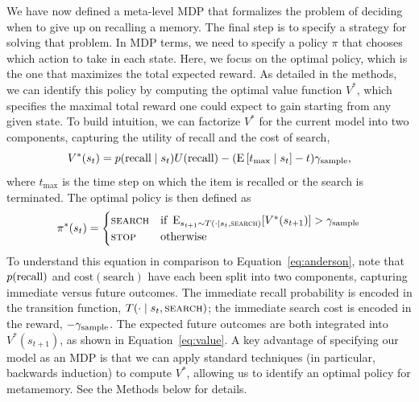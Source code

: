We have now defined a meta-level MDP that formalizes the problem of deciding when to give up on recalling a memory. The final step is to specify a strategy for solving that problem. In MDP terms, we need to specify a policy $\pi$ that chooses which action to take in each state. Here, we focus on the optimal policy, which is the one that maximizes the total expected reward. As detailed in the methods, we can identify this policy by computing the optimal value function $V^*$, which specifies the maximal total reward one could expect to gain starting from any given state. To build intuition, we can factorize $V^*$ for the current model into two components, capturing the utility of recall and the cost of search,
%
\begin{equation}\label{eq:value}
  V^*(s_t) = p(\text{recall} \mid s_t) U({\text{recall}}) - 
  (\operatorname*{E}\left[t_\text{max}\mid s_t\right] - t)\gamma_\text{sample},
\end{equation}
%
where $t_\text{max}$ is the time step on which the item is recalled or the search is terminated. The optimal policy is then defined as
%
\begin{equation}\label{eq:policy}
  \pi^*(s_t) = \begin{cases}
    \textsc{search} & \text{if } \operatorname*{E}_{s_{t+1} \sim T(\cdot \mid s_t, \textsc{search})}[V^*(s_{t+1})] > \gamma_\text{sample} \\
    \textsc{stop} & \text{otherwise}
  \end{cases}
\end{equation}
%
To understand this equation in comparison to Equation~\ref{eq:anderson}, note that $p({\text{recall}})$ and $\text{cost}(\text{search})$ have each been split into two components, capturing immediate versus future outcomes. The immediate recall probability is encoded in the transition function, $T(\cdot \mid s_t, \textsc{search})$; the immediate search cost is encoded in the reward, $-\gamma_\text{sample}$. The expected future outcomes are both integrated into $V^*(s_{t+1})$, as shown in Equation~\ref{eq:value}.
A key advantage of specifying our model as an MDP is that we can apply standard techniques (in particular, backwards induction) to compute $V^*$, allowing us to identify an optimal policy for metamemory. See the Methods below for details.


